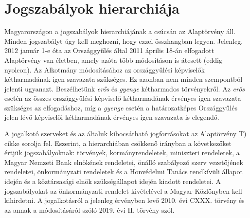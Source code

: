 \section{Jogszabályok hierarchiája}

Magyarországon a jogszabályok hierarchiájának a csúcsán az Alaptörvény áll. Minden jogszabályt úgy kell meghozni, hogy ezzel összhangban legyen. Jelenleg, 2012 január 1-e óta az Országgyűlés által 2011 április 18-án elfogadott Alaptörvény van életben, amely azóta több módosításon is átesett (eddig nyolcon). Az Alkotmány módosításához az országgyűlési képviselők kétharmadának igen szavazata szükséges. Ez azonban nem minden szempontból jelenti ugyanazt. Beszélhetünk \textit{erős} és \textit{gyenge} kétharmados törvényekről. Az \textit{erős} esetén az összes országgyűlési képviselő kétharmadának érvényes igen szavazata szükséges az elfogadáshoz, míg a \textit{gyenge} esetén a határozatképes Országgyűlés jelen lévő képviselői kétharmadának érvényes igen szavazata is elegendő.

A jogalkotó szerveket és az általuk kibocsátható jogforrásokat az Alaptörvény T) cikke sorolja fel. Eszerint, a hierarchiában csökkenő irányban a következőket értjük jogszabályoknak: törvények, kormányrendeletek, miniszteri rendeletek, a Magyar Nemzeti Bank elnökének rendeletei, önálló szabályozó szerv vezetőjének rendeletei, önkormányzati rendeletek és a Honvédelmi Tanács rendkívüli állapot idején és a köztársasági elnök szükségállapot idején kiadott rendeletei. A jogszabályokat az önkormányzati rendelet kivételével a Magyar Közlönyben kell kihirdetni. A jogalkotásról a jelenleg érvényben levő 2010. évi CXXX. törvény és az annak a módosításáról szóló 2019. évi II. törvény szól. \cite{jog-hierarchiaja, alaptorveny, 2010-CXXX, 2019-II}